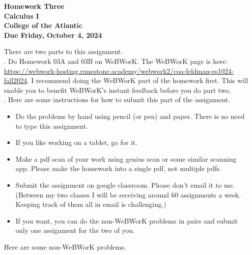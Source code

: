 \documentclass[12pt]{article}
\begin{document}
\pagestyle{empty}
 
\begin{center}
{\LARGE {\bf Homework Three}}\\
\bigskip
{\Large {\bf Calculus I}}\\
\bigskip
{\Large {\bf College of the Atlantic}}\\
\bigskip
{ {\bf Due Friday, October 4, 2024}}\\ 
\end{center}
\medskip


\noindent There are two parts to this assignment.\\

.  Do Homework 03A and 03B on WeBWorK.
The WeBWorK page is here:
\url{https://webwork-hosting.runestone.academy/webwork2/coa-feldman-es1024-fall2024}.
I recommend doing the WeBWorK part of the homework first.  This will
enable you to benefit WeBWorK's instant feedback before you do part
two.\\ 


.  Here are some
instructions for how to submit this part of the assignment.
\begin{itemize}
  \setlength{\itemsep}{0mm}
\item Do the problems by hand using pencil (or pen) and paper.
  There is no need to type this assignment.
\item If you like working on a tablet, go for it. 
\item Make a pdf scan of your work using genius scan or some
  similar scanning app.  Please make the homework into a single
  pdf, not multiple pdfs.
\item Submit the assignment on google classroom.  Please don't
  email it to me.  (Between my two classes I will be receiving
  around 60 assignments a week.  Keeping track of them all in email 
  is challenging.)
\item If you want, you can do the non-WeBWorK problems in pairs and
  submit only one assignment for the two of you. \\
\end{itemize}

\noindent Here are some non-WeBWorK problems.
\end{document}
